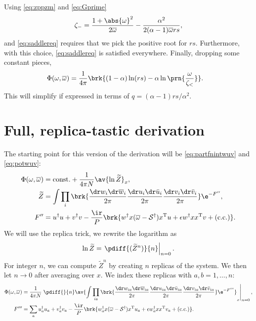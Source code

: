 \documentclass[12pt]{article}
\newcommand{\dg}{^\dagger}
\newcommand{\trans}{^\mathrm{T}}
\newcommand{\shift}{\mathcal{S}}
\newcommand{\omb}{\overline{\omega}}
\newcommand{\dw}{\dr w}
\newcommand{\dwb}{\dr\overline{w}}
\newcommand{\du}{\dr u}
\newcommand{\dub}{\dr\bar{u}}
\newcommand{\dv}{\dr v}
\newcommand{\dvb}{\dr\bar{v}}
\begin{document}
%
Using \eqref{eq:zppzm} and \eqref{eq:Gprime}
%
\begin{equation}\label{eq:saddlesolzm}
\begin{aligned}
  \zeta_- &= \frac{1+\abs{\omega}^2}{2\omb} - \frac{\alpha^2}{2(\alpha-1)\omb rs},\\
\end{aligned}
\end{equation}
%
and \eqref{eq:saddlereq} requires that we pick the positive root for $rs$.
Furthermore, with this choice, \eqref{eq:saddlereq} is satisfied everywhere.
Finally, dropping some constant pieces,
%
\begin{equation}\label{eq:saddlesol}
\begin{aligned}
 \Phi(\omega,\omb) &= \frac{1}{4\pi}\brk{ (1-\alpha)\ln(rs) -\alpha\ln\prn{\frac{\omega}{\zeta_<}} }.
\end{aligned}
\end{equation}
%
This will simplify if expressed in terms of $q=(\alpha-1)rs/\alpha^2$.




\section{Full, replica-tastic derivation}\label{sec:replicader}


The starting point for this version of the derivation will be \eqref{eq:partfnintwuv} and \eqref{eq:potwuv}:
%
\begin{equation}\label{eq:phiint}
  \begin{aligned}
    \Phi(\omega,\omb) &= \text{const.} + \frac{1}{4\pi N} \av{\ln \widetilde{Z}}_x, \\
    \widetilde{Z} &= \int \prod_i\brk{ \frac{\dw_i\dwb_i}{2\pi} \frac{\du_i\dub_i}{2\pi} \frac{\dv_i\dvb_i}{2\pi} } \e^{-F''}, \\
    F'' &=  u\dg u + v\dg v -\frac{\ir}{P}\brk{ w\dg x(\omb-\shift\dg)x\trans u + \epsilon w\dg xx\trans v + (\text{c.c.}) }.
  \end{aligned}
\end{equation}
%
We will use the replica trick, \ie we rewrite the logarithm as
%
\begin{equation}\label{eq:replicatrick}
  \ln \widetilde{Z} = \left. \pdiff{( \widetilde{Z}^n )}{n}\right\rvert_{n=0}.
\end{equation}
%
For integer $n$, we can compute $\widetilde{Z}^n$ by creating $n$ replicas of the system.
We then let $n\to0$ after averaging over $x$.
We index these replicas with $a,b=1,\ldots,n$:
%
\begin{equation}\label{eq:phirep}
    \begin{aligned}
    \Phi(\omega,\omb) &= \frac{1}{4\pi N}  \left.\pdiff{}{n}\av{
       \int \prod_{ia}\brk{ \frac{\dw_{ia}\dwb_{ia}}{2\pi} \frac{\du_{ia}\dub_{ia}}{2\pi} \frac{\dv_{ia}\dvb_{ia}}{2\pi} } \e^{-F'''}
       }_x\right\rvert_{n=0}, \\
    F''' &= \sum_a  u_a\dg u_a + v_a\dg v_a -\frac{\ir}{P}\brk{ w_a\dg x(\omb-\shift\dg)x\trans u_a + \epsilon w_a\dg xx\trans v_a + (\text{c.c.}) }.
  \end{aligned}
\end{equation}
%
\end{document}
